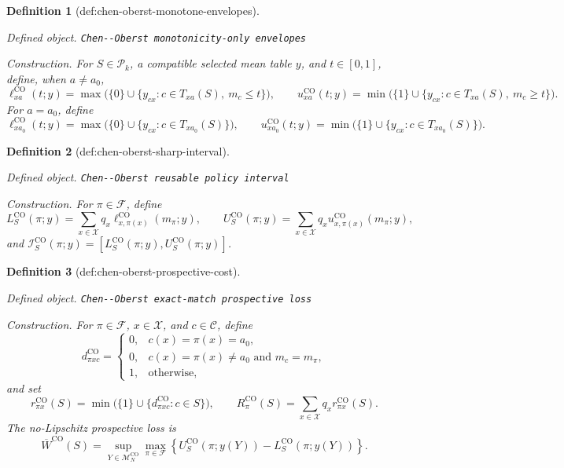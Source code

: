 \documentclass{article}
\newtheorem{definition}{Definition}
\begin{document}
\begin{definition}[def:chen-oberst-monotone-envelopes]\label{def:chen-oberst-monotone-envelopes}
\par\smallskip\noindent\emph{Defined object.} \texttt{Chen-\allowbreak{}-\allowbreak{}Oberst monotonicity-\allowbreak{}only envelopes}
\par\smallskip\noindent\emph{Construction.} For \(S\in\mathcal P_k\), a compatible selected mean table \(y\), and \(t\in[0,1]\), define, when \(a\neq a_0\),
\[
\ell^{\mathrm{CO}}_{xa}(t;y)
=\max\bigl(\{0\}\cup\{y_{cx}:c\in T_{xa}(S),\ m_c\leq t\}\bigr),
\qquad
u^{\mathrm{CO}}_{xa}(t;y)
=\min\bigl(\{1\}\cup\{y_{cx}:c\in T_{xa}(S),\ m_c\geq t\}\bigr).
\]
For \(a=a_0\), define
\[
\ell^{\mathrm{CO}}_{x a_0}(t;y)
=\max\bigl(\{0\}\cup\{y_{cx}:c\in T_{x a_0}(S)\}\bigr),
\qquad
u^{\mathrm{CO}}_{x a_0}(t;y)
=\min\bigl(\{1\}\cup\{y_{cx}:c\in T_{x a_0}(S)\}\bigr).
\]
\end{definition}

\begin{definition}[def:chen-oberst-sharp-interval]\label{def:chen-oberst-sharp-interval}
\par\smallskip\noindent\emph{Defined object.} \texttt{Chen-\allowbreak{}-\allowbreak{}Oberst reusable policy interval}
\par\smallskip\noindent\emph{Construction.} For \(\pi\in\mathcal F\), define
\[
L^{\mathrm{CO}}_S(\pi;y)
=\sum_{x\in\mathcal X}q_x\ell^{\mathrm{CO}}_{x,\pi(x)}(m_\pi;y),
\qquad
U^{\mathrm{CO}}_S(\pi;y)
=\sum_{x\in\mathcal X}q_xu^{\mathrm{CO}}_{x,\pi(x)}(m_\pi;y),
\]
and \(\mathcal I^{\mathrm{CO}}_S(\pi;y)=[L^{\mathrm{CO}}_S(\pi;y),U^{\mathrm{CO}}_S(\pi;y)]\).
\end{definition}

\begin{definition}[def:chen-oberst-prospective-cost]\label{def:chen-oberst-prospective-cost}
\par\smallskip\noindent\emph{Defined object.} \texttt{Chen-\allowbreak{}-\allowbreak{}Oberst exact-\allowbreak{}match prospective loss}
\par\smallskip\noindent\emph{Construction.} For \(\pi\in\mathcal F\), \(x\in\mathcal X\), and \(c\in\mathcal C\), define
\[
d^{\mathrm{CO}}_{\pi xc}
=\begin{cases}
0,&c(x)=\pi(x)=a_0,\\
0,&c(x)=\pi(x)\neq a_0\text{ and }m_c=m_\pi,\\
1,&\text{otherwise},
\end{cases}
\]
and set
\[
r^{\mathrm{CO}}_{\pi x}(S)
=\min\bigl(\{1\}\cup\{d^{\mathrm{CO}}_{\pi xc}:c\in S\}\bigr),
\qquad
R^{\mathrm{CO}}_\pi(S)
=\sum_{x\in\mathcal X}q_xr^{\mathrm{CO}}_{\pi x}(S).
\]
The no-Lipschitz prospective loss is
\[
\overline W^{\mathrm{CO}}(S)
=\sup_{Y\in\mathcal M_N^{\mathrm{CO}}}
\max_{\pi\in\mathcal F}
\left\{U^{\mathrm{CO}}_S(\pi;y(Y))-L^{\mathrm{CO}}_S(\pi;y(Y))\right\}.
\]
\end{definition}
\end{document}
